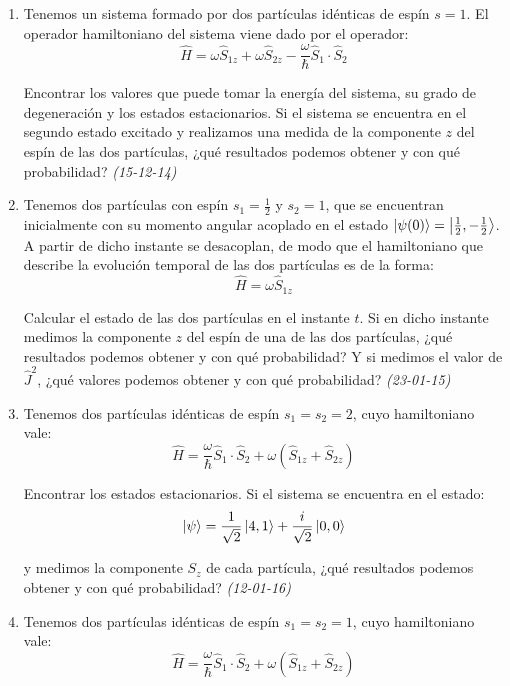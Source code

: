 \begin{enumerate}
    \item Tenemos un sistema formado por dos partículas idénticas de espín \( s = 1 \). El operador hamiltoniano del sistema viene dado por el operador:
    \[
    \hat{H} = \omega \hat{S}_{1z} + \omega \hat{S}_{2z} - \frac{\omega}{\hbar} \hat{S}_1 \cdot \hat{S}_2
    \]
    
    Encontrar los valores que puede tomar la energía del sistema, su grado de degeneración y los estados estacionarios. Si el sistema se encuentra en el segundo estado excitado y realizamos una medida de la componente \( z \) del espín de las dos partículas, ¿qué resultados podemos obtener y con qué probabilidad? \textit{(15-12-14)}

    \item Tenemos dos partículas con espín \( s_1 = \frac{1}{2} \) y \( s_2 = 1 \), que se encuentran inicialmente con su momento angular acoplado en el estado \( \ket{\psi (0)} = \ket{\frac{1}{2}, -\frac{1}{2}} \). A partir de dicho instante se desacoplan, de modo que el hamiltoniano que describe la evolución temporal de las dos partículas es de la forma:
    \[
    \hat{H} = \omega \hat{S}_{1z}
    \]
    
    Calcular el estado de las dos partículas en el instante \( t \). Si en dicho instante medimos la componente \( z \) del espín de una de las dos partículas, ¿qué resultados podemos obtener y con qué probabilidad? Y si medimos el valor de \( \hat{J}^2 \), ¿qué valores podemos obtener y con qué probabilidad? \textit{(23-01-15)}
    
    
    \item Tenemos dos partículas idénticas de espín \( s_1 = s_2 = 2 \), cuyo hamiltoniano vale:
    \[
    \hat{H} = \frac{\omega}{\hbar} \hat{S}_1 \cdot \hat{S}_2 + \omega \left( \hat{S}_{1z} + \hat{S}_{2z} \right)
    \]
    
    Encontrar los estados estacionarios. Si el sistema se encuentra en el estado:
    \[
    \ket{\psi} = \frac{1}{\sqrt{2}} \ket{4, 1} + \frac{i}{\sqrt{2}} \ket{0, 0}
    \]
    
    y medimos la componente \( S_z \) de cada partícula, ¿qué resultados podemos obtener y con qué probabilidad? \textit{(12-01-16)}
    
    \item Tenemos dos partículas idénticas de espín \( s_1 = s_2 = 1 \), cuyo hamiltoniano vale:
    \[
    \hat{H} = \frac{\omega}{\hbar} \hat{S}_1 \cdot \hat{S}_2 + \omega \left( \hat{S}_{1z} + \hat{S}_{2z} \right)
    \]
    

\end{enumerate}
